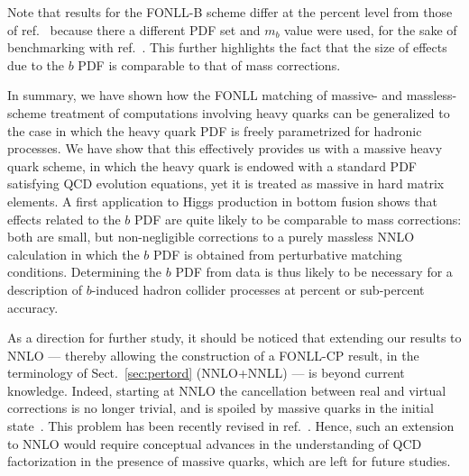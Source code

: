 Note that results for the FONLL-B
scheme differ at the percent level from those of 
ref.~\cite{Forte:2016sja} because there a different PDF set and $m_b$
value were used,
for the sake of benchmarking with
ref.~\cite{Bonvini:2015pxa,Bonvini:2016fgf}. This further highlights
the fact that the size of effects due to the $b$ PDF is comparable to
that of mass corrections.

In summary, we have shown how the FONLL matching of massive- and
massless-scheme treatment of computations involving heavy quarks can
be generalized to the case in which the heavy quark PDF is freely
parametrized for hadronic processes. We have show that this
effectively provides us with a massive heavy quark scheme, in which
the heavy quark is endowed with a standard PDF satisfying QCD
evolution equations, yet it is treated as massive in hard matrix
elements. A first application to Higgs production in bottom fusion
shows that effects related to the $b$ PDF are quite likely to be
comparable to mass corrections: both are small, but non-negligible
corrections to a purely massless NNLO calculation in which the $b$ PDF
is obtained from perturbative matching conditions. Determining the $b$
PDF from data is thus likely to be necessary for a description of
$b$-induced hadron collider processes at percent or sub-percent accuracy.

As a direction for further study, it should be noticed that extending
our results to NNLO --- thereby allowing the construction of a
FONLL-CP result, in the terminology of Sect.~\ref{sec:pertord}
(NNLO+NNLL) --- is beyond current knowledge. Indeed, starting at NNLO
the cancellation between real and virtual
corrections is no longer trivial, and is spoiled by
massive quarks in the initial
state~\cite{Doria:1980ak,Catani:1985xt}. 
This problem has been recently revised in ref.~\cite{Caola:2020xup}.
Hence, such an extension to NNLO
would require conceptual advances in the understanding of QCD
factorization in the presence of massive quarks, which are left for
future studies.

